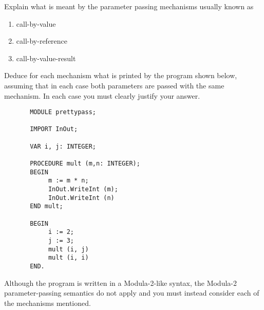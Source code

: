 \begin{questions}
\begin{subquestions}
\subquestion

        Explain what is meant by the parameter passing mechanisms usually
        known as
                \begin{enumerate}
                \item call-by-value
                \item call-by-reference
                \item call-by-value-result
                \end{enumerate}
        Deduce for each mechanism what is printed by the 
        program shown below, assuming that in each
	case both parameters are passed with the same mechanism.
        In each case you must clearly justify your answer.
\begin{verbatim}
       MODULE prettypass;
       
       IMPORT InOut;

       VAR i, j: INTEGER;

       PROCEDURE mult (m,n: INTEGER);
       BEGIN
            m := m * n;
            InOut.WriteInt (m);
            InOut.WriteInt (n)
       END mult;
               
       BEGIN
            i := 2;
            j := 3;
            mult (i, j)
            mult (i, i)
       END.
\end{verbatim}                   
Although the program is written in a Modula-2-like syntax, 
the Modula-2 parameter-passing semantics do not apply and you must
instead consider each of the mechanisms mentioned.

\end{subquestions}
\end{questions}



